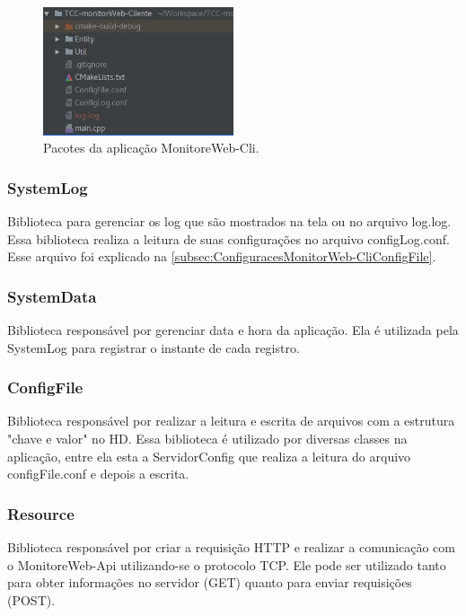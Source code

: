 \begin{figure}[H]
	\centering
	\includegraphics[width=0.5\textwidth]{figuras/pacotes-monitoreWeb-Cli.jpg}
	\caption[Pacotes da aplicação MonitoreWeb-Cli.]{Pacotes da aplicação MonitoreWeb-Cli.}
	\label{Img:Cli-Diagrama}
\end{figure}



\subsubsection{SystemLog}

Biblioteca para gerenciar os log que são mostrados na tela ou no arquivo log.log. Essa biblioteca realiza a leitura de suas configurações no arquivo configLog.conf. Esse arquivo foi explicado na \autoref{subsec:ConfiguracesMonitorWeb-CliConfigFile}.

\subsubsection{SystemData}

Biblioteca responsável por gerenciar data e hora da aplicação. Ela é utilizada pela SystemLog para registrar o instante de cada registro.

\subsubsection{ConfigFile}

Biblioteca responsável por realizar a leitura e escrita de arquivos com a estrutura "chave e valor" no HD. Essa biblioteca é utilizado por diversas classes na aplicação, entre ela esta a ServidorConfig que realiza a leitura do arquivo configFile.conf e depois a escrita. 

\subsubsection{Resource}

Biblioteca responsável por criar a requisição HTTP e realizar a comunicação com o MonitoreWeb-Api utilizando-se o protocolo TCP. Ele pode ser utilizado tanto para obter informações no servidor (GET) quanto para enviar requisições (POST). 

